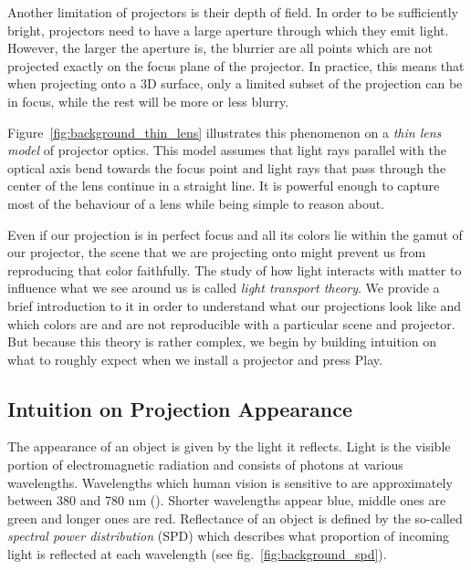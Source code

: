 Another limitation of projectors is their depth of field. In order to be sufficiently bright, projectors need to have a large aperture through which they emit light. However, the larger the aperture is, the blurrier are all points which are not projected exactly on the focus plane of the projector. In practice, this means that when projecting onto a 3D surface, only a limited subset of the projection can be in focus, while the rest will be more or less blurry.

Figure~\ref{fig:background_thin_lens} illustrates this phenomenon on a \textit{thin lens model} of projector optics. This model assumes that light rays parallel with the optical axis bend towards the focus point and light rays that pass through the center of the lens continue in a straight line. It is powerful enough to capture most of the behaviour of a lens while being simple to reason about.

Even if our projection is in perfect focus and all its colors lie within the gamut of our projector, the scene that we are projecting onto might prevent us from reproducing that color faithfully. The study of how light interacts with matter to influence what we see around us is called \textit{light transport theory}. We provide a brief introduction to it in order to understand what our projections look like and which colors are and are not reproducible with a particular scene and projector. But because this theory is rather complex, we begin by building intuition on what to roughly expect when we install a projector and press Play.

\subsection{Intuition on Projection Appearance}
\label{section:background-projection_mapping-projection_intuition}

The appearance of an object is given by the light it reflects. Light is the visible portion of electromagnetic radiation and consists of photons at various wavelengths. Wavelengths which human vision is sensitive to are approximately between 380 and 780 nm (\citet{PBRT3e}). Shorter wavelengths appear blue, middle ones are green and longer ones are red. Reflectance of an object is defined by the so-called \textit{spectral power distribution} (SPD) which describes what proportion of incoming light is reflected at each wavelength (see fig.~\ref{fig:background_spd}).

